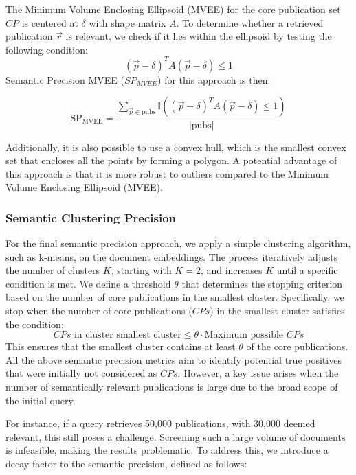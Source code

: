 The Minimum Volume Enclosing Ellipsoid (MVEE) for the core publication set $CP$ is centered at $\delta$ with shape matrix $A$. To determine whether a retrieved publication $\vec{r}$ is relevant, we check if it lies within the ellipsoid by testing the following condition:
\[
(\vec{p} - \delta)^T A (\vec{p} - \delta) \leq 1
\]
Semantic Precision MVEE ($SP_{MVEE}$) for this approach is then:

\begin{equation}\label{eq:sp-mvee}
	\text{SP}_{\text{MVEE}} = \frac{\sum_{\vec{p} \in \text{pubs}} \mathbb{I} \left( (\vec{p} - \delta)^T A (\vec{p} - \delta) \leq 1 \right)}{|\text{pubs}|}
\end{equation}

Additionally, it is also possible to use a convex hull, which is the smallest convex set that encloses all the points by forming a polygon. A potential advantage of this approach is that it is more robust to outliers compared to the Minimum Volume Enclosing Ellipsoid (MVEE).

\subsubsection{Semantic Clustering Precision}

For the final semantic precision approach, we apply a simple clustering algorithm, such as k-means, on the document embeddings. The process iteratively adjusts the number of clusters \( K \), starting with \( K=2 \), and increases \( K \) until a specific condition is met. We define a threshold \( \theta \) that determines the stopping criterion based on the number of core publications in the smallest cluster. Specifically, we stop when the number of core publications (\( CPs \)) in the smallest cluster satisfies the condition:
\begin{equation}
CPs \text{ in cluster smallest cluster} \leq \theta \cdot \text{Maximum possible } CPs
 \end{equation}\label{eq:sp-clustering}
This ensures that the smallest cluster contains at least \( \theta \) of the core publications.
All the above semantic precision metrics aim to identify potential true positives that were initially not considered as \( CPs \). However, a key issue arises when the number of semantically relevant publications is large due to the broad scope of the initial query. 

For instance, if a query retrieves 50,000 publications, with 30,000 deemed relevant, this still poses a challenge. Screening such a large volume of documents is infeasible, making the results problematic. To address this, we introduce a decay factor to the semantic precision, defined as follows:

